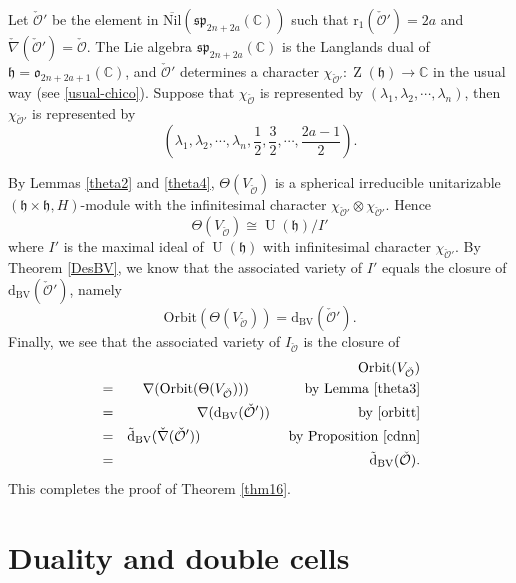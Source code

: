 \documentclass[12pt,a4paper]{amsart}
\newcommand{\BC}{{\mathbb {C}}}
\newcommand{\CO}{{\mathcal {O}}}
\newcommand{\oZ}{\operatorname{Z}}
\newcommand{\oU}{\operatorname{U}}
\newcommand{\h}{\mathfrak h}
\newcommand{\p}{\mathfrak p}
\newcommand{\s}{\mathfrak s}
\renewcommand{\o}{\mathfrak o}
\newcommand{\be}{\begin {equation}}
\newcommand{\ee}{\end {equation}}
\numberwithin{equation}{section}
\theoremstyle{remark}
\begin{document}
Let $\check \CO'$ be the element in $\overline{\mathrm{Nil}}(\s\p_{2n+2a}(\BC))$ such that $\mathrm{r}_1(\check \CO')=2a$ and $\check \nabla(\check \CO')=\check \CO$. The Lie algebra  $\s\p_{2n+2a}(\BC)$ is the  Langlands dual of $\h=\o_{2n+2a+1}(\BC)$, and $\check \CO'$ determines a character $\chi_{\check \CO'}: \oZ(\h)\rightarrow \BC$ in the usual way (see \eqref{usual-chico}). Suppose that $\chi_{\check \CO}$ is represented by  $(\lambda_1, \lambda_2, \cdots, \lambda_n)$, then  $\chi_{\check \CO'}$ is represented by
\[
  (\lambda_1, \lambda_2, \cdots, \lambda_n, \frac{1}{2}, \frac{3}{2}, \cdots, \frac{2a-1}{2}).
\]




By Lemmas \ref{theta2} and \ref{theta4}, $\Theta(V_{\check \CO})$ is a spherical irreducible unitarizable $(\h\times \h, H)$-module with the infinitesimal character $\chi_{\check \CO'}\otimes \chi_{\check \CO'}$.
Hence
\[
  \Theta(V_{\check \CO})\cong \oU(\h)/I'
\]
where $I'$ is the maximal ideal of $\oU(\h)$ with infinitesimal
character $\chi_{\check \CO'}$. By Theorem \ref{DesBV}, we
know that the associated variety of $I'$ equals the closure of $\mathrm d_{\mathrm{BV}}(\check \CO')$, namely
\be\label{orbitt} \mathrm{Orbit}(\Theta(V_{\check \CO}))=\mathrm d_{\mathrm{BV}}(\check
\CO').  \ee Finally, we see that the associated variety of $I_{\check \CO}$ is the closure of
\begin{eqnarray*}
   && \mathrm{Orbit}(V_{\check \CO}) \\
   &=& \nabla(\mathrm{Orbit}(\Theta(V_{\check \CO})))\qquad \quad \quad \textrm{by Lemma \ref{theta3}}\\
&=&\nabla(\mathrm d_{\mathrm{BV}}(\check \CO')) \qquad  \quad \quad \qquad \,\,\textrm{by \eqref{orbitt}}\\
&=&\tilde{\mathrm d}_{\mathrm{BV}}(\check \nabla(\check \CO')) \qquad  \quad \quad \qquad \,\,\textrm{by Proposition \ref{cdnn}}\\
&=&\tilde{\mathrm d}_{\mathrm{BV}}(\check \CO).
\end{eqnarray*}
This completes the proof of Theorem \ref{thm16}.


\section{Duality and double cells}
\label{sec:cell}
\end{document}
